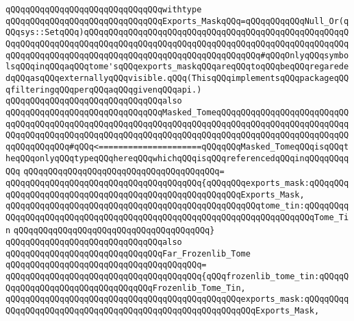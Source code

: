 \newline
\verb|qQQqqQQqqQQqqQQqqQQqqQQqqQQqqQQqwithtype|\newline
\verb|qQQqqQQqqQQqqQQqqQQqqQQqqQQqqQQqExports_MaskqQQq=qQQqqQQqqQQqNull_Or(qQQqsys::SetqQQq)qQQqqQQqqQQqqQQqqQQqqQQqqQQqqQQqqQQqqQQqqQQqqQQqqQQqqQQqqQQqqQQqqQQqqQQqqQQqqQQqqQQqqQQqqQQqqQQqqQQqqQQqqQQqqQQqqQQqqQQqqQQqqQQqqQQqqQQqqQQqqQQqqQQqqQQqqQQqqQQqqQQqqQQqqQQqqQQq#qQQqOnlyqQQqsymbolsqQQqinqQQqaqQQqtome'sqQQqexports_maskqQQqareqQQqtoqQQqbeqQQqregarededqQQqasqQQqexternallyqQQqvisible.qQQq(ThisqQQqimplementsqQQqpackageqQQqfilteringqQQqperqQQqaqQQqgivenqQQqapi.)|\newline
\newline
\verb|qQQqqQQqqQQqqQQqqQQqqQQqqQQqqQQqalso|\newline
\verb|qQQqqQQqqQQqqQQqqQQqqQQqqQQqqQQqMasked_TomeqQQqqQQqqQQqqQQqqQQqqQQqqQQqqQQqqQQqqQQqqQQqqQQqqQQqqQQqqQQqqQQqqQQqqQQqqQQqqQQqqQQqqQQqqQQqqQQqqQQqqQQqqQQqqQQqqQQqqQQqqQQqqQQqqQQqqQQqqQQqqQQqqQQqqQQqqQQqqQQqqQQqqQQqqQQqqQQqqQQq#qQQq<=====================qQQqqQQqMasked_TomeqQQqisqQQqtheqQQqonlyqQQqtypeqQQqhereqQQqwhichqQQqisqQQqreferencedqQQqinqQQqqQQqqQQq|\newline
\verb|qQQqqQQqqQQqqQQqqQQqqQQqqQQqqQQqqQQqqQQq=|\newline
\verb|qQQqqQQqqQQqqQQqqQQqqQQqqQQqqQQqqQQqqQQq{qQQqqQQqexports_mask:qQQqqQQqqQQqqQQqqQQqqQQqqQQqqQQqqQQqqQQqqQQqqQQqqQQqqQQqExports_Mask,|\newline
\verb|qQQqqQQqqQQqqQQqqQQqqQQqqQQqqQQqqQQqqQQqqQQqqQQqqQQqtome_tin:qQQqqQQqqQQqqQQqqQQqqQQqqQQqqQQqqQQqqQQqqQQqqQQqqQQqqQQqqQQqqQQqqQQqqQQqTome_Tin|\newline
\verb|qQQqqQQqqQQqqQQqqQQqqQQqqQQqqQQqqQQqqQQq}|\newline
\newline
\verb|qQQqqQQqqQQqqQQqqQQqqQQqqQQqqQQqalso|\newline
\verb|qQQqqQQqqQQqqQQqqQQqqQQqqQQqqQQqFar_Frozenlib_Tome|\newline
\verb|qQQqqQQqqQQqqQQqqQQqqQQqqQQqqQQqqQQqqQQq=|\newline
\verb|qQQqqQQqqQQqqQQqqQQqqQQqqQQqqQQqqQQqqQQq{qQQqfrozenlib_tome_tin:qQQqqQQqqQQqqQQqqQQqqQQqqQQqqQQqqQQqFrozenlib_Tome_Tin,|\newline
\verb|qQQqqQQqqQQqqQQqqQQqqQQqqQQqqQQqqQQqqQQqqQQqqQQqexports_mask:qQQqqQQqqQQqqQQqqQQqqQQqqQQqqQQqqQQqqQQqqQQqqQQqqQQqqQQqqQQqExports_Mask,|\newline
